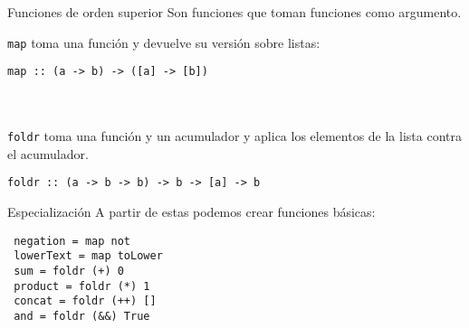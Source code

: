 \begin{frame}[fragile]{Funciones de orden superior}
  Son funciones que toman funciones como argumento.

  \espacio

  \texttt{map} toma una función y devuelve su versión sobre listas:
  \begin{lstlisting}
map :: (a -> b) -> ([a] -> [b])
  \end{lstlisting}
  \\~\\
  \texttt{foldr} toma una función y un acumulador
  y aplica los elementos de la lista contra el acumulador.
  \begin{lstlisting}
foldr :: (a -> b -> b) -> b -> [a] -> b
  \end{lstlisting}

\end{frame}

\begin{frame}[fragile]{Especialización}
  A partir de estas podemos crear funciones básicas:

  \espacio

  \begin{lstlisting}
 negation = map not
 lowerText = map toLower
 sum = foldr (+) 0
 product = foldr (*) 1
 concat = foldr (++) []
 and = foldr (&&) True
  \end{lstlisting}
  \espacio

\end{frame}
